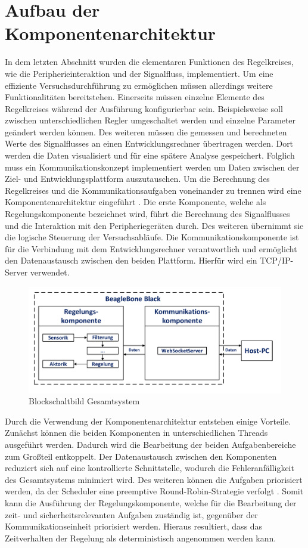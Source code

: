 \section{Aufbau der Komponentenarchitektur}
In dem letzten Abschnitt wurden die elementaren Funktionen des Regelkreises, wie die Peripherieinteraktion und der Signalfluss, implementiert. Um eine effiziente Versuchsdurchführung zu ermöglichen müssen allerdings weitere Funktionalitäten bereitstehen. Einerseits müssen einzelne Elemente des Regelkreises während der Ausführung konfigurierbar sein. Beispielsweise soll zwischen unterschiedlichen Regler umgeschaltet werden und einzelne Parameter geändert werden können. Des weiteren müssen die gemessen und berechneten Werte des Signalflusses an einen Entwicklungsrechner übertragen werden. Dort werden die Daten visualisiert und für eine spätere Analyse gespeichert.
Folglich muss ein Kommunikationskonzept implementiert werden um Daten zwischen der Ziel- und Entwicklungsplattform auszutauschen. Um die Berechnung des Regelkreises und die Kommunikationsaufgaben voneinander zu trennen wird eine Komponentenarchitektur eingeführt \cite[S. 279 ff.]{Wietzke1}. Die erste Komponente, welche als Regelungskomponente bezeichnet wird, führt die Berechnung des Signalflusses und die Interaktion mit den Peripheriegeräten durch. Des weiteren übernimmt sie die logische Steuerung der Versuchsabläufe. Die Kommunikationskomponente ist für die Verbindung mit dem Entwicklungsrechner verantwortlich und ermöglicht den Datenaustausch zwischen den beiden Plattform. Hierfür wird ein TCP/IP-Server verwendet.
\begin{figure}[!h]
\centering
\includegraphics[width=\linewidth]{img/SW_1_KA_BSB.pdf}
\caption{Blockschaltbild Gesamtsystem}
\end{figure}
Durch die Verwendung der Komponentenarchitektur entstehen einige Vorteile. Zunächst können die beiden Komponenten in unterschiedlichen Threads ausgeführt werden. Dadurch wird die Bearbeitung der beiden Aufgabenbereiche zum Großteil entkoppelt. Der Datenaustausch zwischen den Komponenten reduziert sich auf eine kontrollierte Schnittstelle, wodurch die Fehleranfälligkeit des Gesamtsystems minimiert wird. Des weiteren können die Aufgaben priorisiert werden, da der Scheduler eine preemptive Round-Robin-Strategie verfolgt \cite[S. 19]{Wietzke1}. Somit kann die Ausführung der Regelungskomponente, welche für die Bearbeitung der zeit- und sicherheitsrelevanten Aufgaben zuständig ist, gegenüber der Kommunikationseinheit priorisiert werden. Hieraus resultiert, dass das Zeitverhalten der Regelung als deterministisch angenommen werden kann. 


